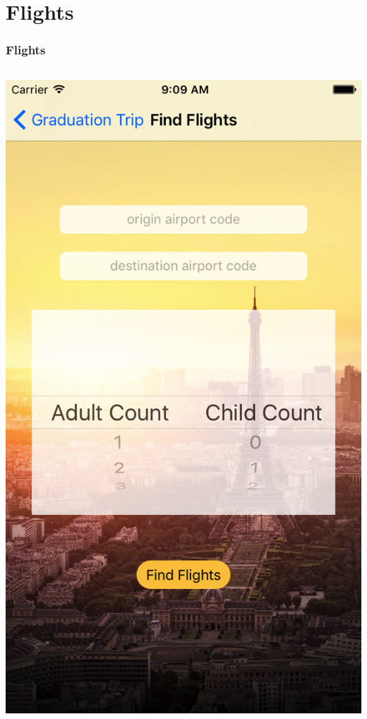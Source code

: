 \documentclass{beamer}
\begin{document}
\section{Flights}
\begin{frame}
\frametitle{Flights}
\begin{columns}
    \begin{column}{0.3\textwidth}
        \begin{center}
            \includegraphics[scale=0.14]{flightsSearch}

\end{center}
\end{column}
\end{columns}
\end{frame}
\end{document}
